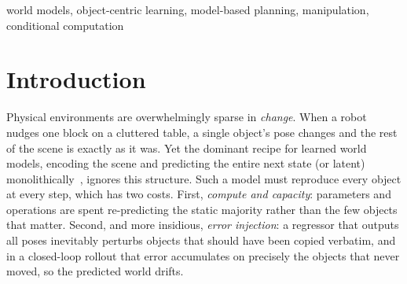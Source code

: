 \documentclass[conference]{IEEEtran}
\begin{document}
\begin{abstract}
Monolithic world models predict the entire next state at every step, spending
capacity re-predicting the static majority of a scene and injecting error into it.
We ask whether explicitly modeling \emph{what changes} (a per-object change gate
plus a residual delta head that perturbs only gated objects, copying the rest
verbatim) is a more effective and interpretable bias. On a MuJoCo tabletop pushing
benchmark (3--8 objects), the sparse/residual model is 2.5--4.6$\times$ more
accurate than a dense MLP at 8.6--11.1$\times$ fewer parameters \emph{overall},
but this headline is driven entirely by error suppression on the static majority:
at $N{=}5$, overall $L_2$ is 0.104 (sparse) vs.\ 0.107 (no-op); at $N{=}8$, 0.081 vs.\
0.081; changed-object $L_2$ is 0.426 vs.\ 0.446 ($N{=}5$) and 0.466 vs.\ 0.470
($N{=}8$), i.e.\ at or barely above the floor of predicting no motion. The durable
win is therefore \emph{change detection that avoids error injection} (F1 0.80--0.87
vs.\ dense degenerate, precision 0.92--0.97) with delta regression at roughly no-op
quality, not accurate dynamics on movers. The gate transfers across counts (99.4\%
F1 retention) and is more sample-efficient. In open-loop rollout sparse compounds
far less error than dense but remains worse than no-op overall at every $N$ and
horizon; we report the decomposition and a mover-only rollout to make this explicit.
For planning, once featurized for planner-visited states, sparse is $0.23\pm0.06$
success vs.\ random $0.15$ (weakest seed exactly 0.15) and dense $0.00$ at every
seed: not significantly better than random, but separated from dense. Code, data
generators, and checkpoints are released at \url{https://github.com/ParamThakkar123/sparse_world_models}.
\end{abstract}

\begin{IEEEkeywords}
world models, object-centric learning, model-based planning, manipulation, conditional computation
\end{IEEEkeywords}

\section{Introduction}
Physical environments are overwhelmingly sparse in \emph{change}. When a robot
nudges one block on a cluttered table, a single object's pose changes and the rest
of the scene is exactly as it was. Yet the dominant recipe for learned world
models, encoding the scene and predicting the entire next state (or latent)
monolithically~\cite{ha2018world,hafner2020dream}, ignores this structure. Such a
model must reproduce every object at every step, which has two costs. First,
\emph{compute and capacity}: parameters and operations are spent re-predicting the
static majority rather than the few objects that matter. Second, and more
insidious, \emph{error injection}: a regressor that outputs all poses inevitably
perturbs objects that should have been copied verbatim, and in a closed-loop
rollout that error accumulates on precisely the objects that never moved, so the
predicted world drifts.
\end{document}
